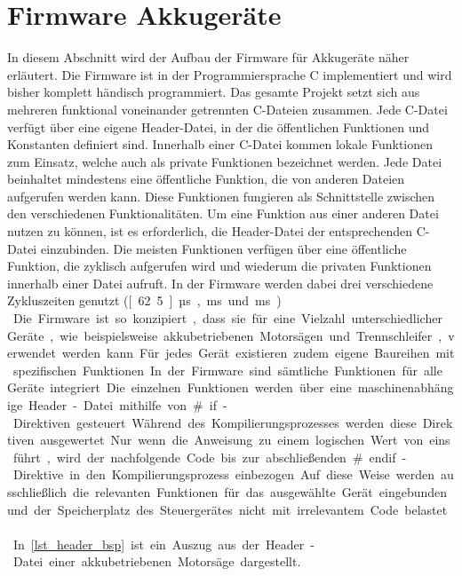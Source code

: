 \section{Firmware Akkugeräte}
\label{sec_stand_der_technik_firmware}
In diesem Abschnitt wird der Aufbau der Firmware für Akkugeräte näher erläutert. Die Firmware ist in der Programmiersprache C implementiert und wird bisher komplett händisch programmiert. Das gesamte Projekt setzt sich aus mehreren funktional voneinander getrennten C-Dateien zusammen. Jede C-Datei verfügt über eine eigene Header-Datei, in der die öffentlichen Funktionen und Konstanten definiert sind. Innerhalb einer C-Datei kommen lokale Funktionen zum Einsatz, welche auch als private Funktionen bezeichnet werden. Jede Datei beinhaltet mindestens eine öffentliche Funktion, die von anderen Dateien aufgerufen werden kann. Diese Funktionen fungieren als Schnittstelle zwischen den verschiedenen Funktionalitäten. Um eine Funktion aus einer anderen Datei nutzen zu können, ist es erforderlich, die Header-Datei der entsprechenden C-Datei einzubinden. Die meisten Funktionen verfügen über eine öffentliche Funktion, die zyklisch aufgerufen wird und wiederum die privaten Funktionen innerhalb einer Datei aufruft. In der Firmware werden dabei drei verschiedene Zykluszeiten genutzt (\unit[62.5]{µs}, \unit[1]{ms} und \unit[10]{ms}) \cite{Firmware_gesamt}. \\
Die Firmware ist so konzipiert, dass sie für eine Vielzahl unterschiedlicher Geräte, wie beispielsweise akkubetriebenen Motorsägen und Trennschleifer, verwendet werden kann. Für jedes Gerät existieren zudem eigene Baureihen mit spezifischen Funktionen. In der Firmware sind sämtliche Funktionen für alle Geräte integriert. Die einzelnen Funktionen werden über eine maschinenabhängige Header-Datei mithilfe von \#if-Direktiven gesteuert. Während des Kompilierungsprozesses werden diese Direktiven ausgewertet. Nur wenn die Anweisung zu einem logischen Wert von eins führt, wird der nachfolgende Code bis zur abschließenden \#endif-Direktive in den Kompilierungsprozess einbezogen. Auf diese Weise werden ausschließlich die relevanten Funktionen für das ausgewählte Gerät eingebunden und der Speicherplatz des Steuergerätes nicht mit irrelevantem Code belastet \cite{Firmware_gesamt} \cite{C_Direktive}. \\
In \autoref{lst_header_bsp} ist ein Auszug aus der Header-Datei einer akkubetriebenen Motorsäge dargestellt.
 
